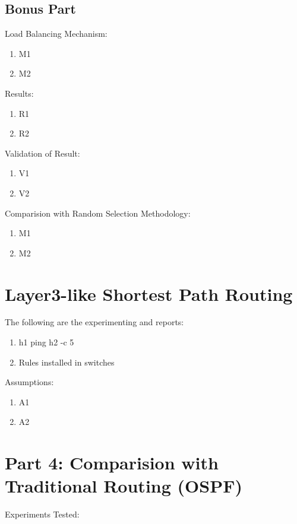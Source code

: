 \documentclass[12pt]{article}
\begin{document}
\subsection{Bonus Part}

Load Balancing Mechanism:
\begin{enumerate}
    \item M1
    \item M2
\end{enumerate}

Results:
\begin{enumerate}
    \item R1
    \item R2
\end{enumerate}

Validation of Result:
\begin{enumerate}
    \item V1
    \item V2
\end{enumerate}

Comparision with Random Selection Methodology:
\begin{enumerate}
    \item M1
    \item M2
\end{enumerate}


\section{Layer3-like Shortest Path Routing}

The following are the experimenting and reports:

\begin{enumerate}
    \item h1 ping h2 -c 5
    \item Rules installed in switches
\end{enumerate}

Assumptions:
\begin{enumerate}
    \item A1
    \item A2
\end{enumerate}


\section{Part 4: Comparision with Traditional Routing (OSPF)}

Experiments Tested:
\end{document}
